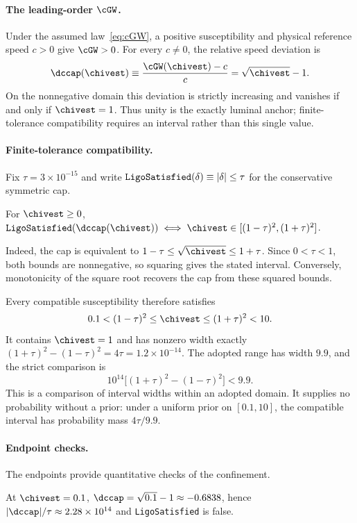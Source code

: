 \paragraph{The leading-order $\cGW$.}
Under the assumed law~\eqref{eq:cGW}, a positive susceptibility
and physical reference speed $c>0$ give $\cGW>0$.
For every $c\ne0$, the relative speed deviation is
\[
  \dccap(\chivest)
  \equiv \frac{\cGW(\chivest)-c}{c}
  = \sqrt{\chivest}-1.
\]
On the nonnegative domain this deviation is strictly increasing
and vanishes if and only if $\chivest=1$. Thus unity is the exactly
luminal anchor; finite-tolerance compatibility requires an interval
rather than this single value.

\paragraph{Finite-tolerance compatibility.}
Fix $\tau=3\times10^{-15}$ and write
$\verb|LigoSatisfied|(\delta)\equiv|\delta|\leq\tau$
for the conservative symmetric cap.

\begin{theorem}
  \label{thm:bicond}
  For $\chivest\geq0$,
  $\verb|LigoSatisfied|(\dccap(\chivest))
  \;\Longleftrightarrow\;
  \chivest\in[(1-\tau)^2,(1+\tau)^2]$.
\end{theorem}

Indeed, the cap is equivalent to
$1-\tau\leq\sqrt{\chivest}\leq1+\tau$.
Since $0<\tau<1$, both bounds are nonnegative, so squaring
gives the stated interval. Conversely, monotonicity of the
square root recovers the cap from these squared bounds.

Every compatible susceptibility therefore satisfies
\[
  0.1<(1-\tau)^2\leq\chivest\leq(1+\tau)^2<10.
\]
It contains $\chivest=1$ and has nonzero width exactly
$(1+\tau)^2-(1-\tau)^2=4\tau=1.2\times10^{-14}$.
The adopted range has width $9.9$, and the strict comparison is
\[
  10^{14}\bigl[(1+\tau)^2-(1-\tau)^2\bigr]<9.9.
\]
This is a comparison of interval widths within an adopted domain.
It supplies no probability without a prior: under a uniform prior
on $[0.1,10]$, the compatible interval has probability mass
$4\tau/9.9$.

\paragraph{Endpoint checks.}
The endpoints provide quantitative checks of the confinement.

\begin{theorem}
  \label{thm:falsifier-lower}
  At $\chivest=0.1$, $\dccap=\sqrt{0.1}-1\approx-0.6838$,
  hence $|\dccap|/\tau\approx2.28\times10^{14}$ and
  \verb|LigoSatisfied| is false.
\end{theorem}

